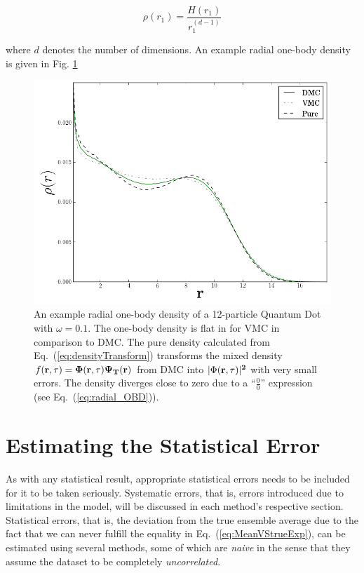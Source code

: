 \begin{equation}
 \rho(r_1) = \frac{H(r_1)}{r_1^{(d-1)}}\label{eq:radial_OBD}
\end{equation}

where $d$ denotes the number of dimensions. An example radial one-body density is given in Fig. \ref{fig:OBD_ex}

\begin{figure}
 \begin{center}
  \includegraphics[scale=0.5]{../Graphics/OBD_rad_ex_12pw01.png}
  \caption{An example radial one-body density of a 12-particle Quantum Dot with $\omega=0.1$. The one-body density is flat in for VMC in comparison to DMC. The pure density calculated from Eq.~(\ref{eq:densityTransform}) transforms the mixed density $f(\bf r, \tau) = \Phi(\bf r, \tau)\Psi_T(\bf r)$ from DMC into $|\Phi(\bf r, \tau)|^2$ with very small errors. The density diverges close to zero due to a ``$\frac{0}{0}$'' expression (see Eq.~(\ref{eq:radial_OBD})).}
  \label{fig:OBD_ex}
 \end{center}
\end{figure}



\section{Estimating the Statistical Error}

As with any statistical result, appropriate statistical errors needs to be included for it to be taken seriously. Systematic errors, that is, errors introduced due to limitations in the model, will be discussed in each method's respective section. Statistical errors, that is, the  deviation from the true ensemble average due to the fact that we can never fulfill the equality in Eq.~(\ref{eq:MeanVStrueExp}), can be estimated using several methods, some of which are \textit{naive} in the sense that they assume the dataset to be completely \textit{uncorrelated}. 

